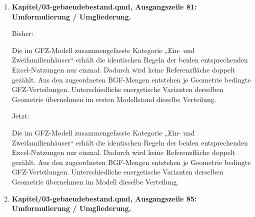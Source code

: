 \documentclass[
  ngerman,
  a4paper,
  DIV=11]{scrreprt}
\newenvironment{Shaded}{\begin{snugshade}}{\end{snugshade}}
\newcommand{\NormalTok}[1]{\textcolor[rgb]{0.00,0.23,0.31}{#1}}
\begin{document}
\begin{enumerate}
\begin{Shaded}
\begin{Highlighting}[]
\NormalTok{Der PE{-}Saldo von **−409,36 PJ PE/a** ist ein Ergebnis des gelieferten Bewertungsstands. Die konkreten Konversionsfaktoren und ihr Bezugsjahr sind nicht bestätigt. Effektive Faktoren unterscheiden sich zwischen Typen und zwischen Import und Export; eine einfache Multiplikation sämtlicher Stromflüsse mit einem Jahresmittel würde die gelieferten PEI nicht reproduzieren. Die sektorale Aufgabe 2040 bleibt auf Endenergiebasis definiert. Eine Bewertung mit heutigen Faktoren stellt die Vergleichbarkeit mit heutigen Nachweisverfahren her und ist keine Prognose der PE{-}Intensitäten 2040 (@sec{-}gebaeude{-}pe).}
\end{Highlighting}
\end{Shaded}
\item
  \textbf{Kapitel/03-gebaeudebestand.qmd, Ausgangszeile 81:
  Umformulierung / Umgliederung.}

  Bisher:

\begin{Shaded}
\begin{Highlighting}[]
\NormalTok{Die im GFZ{-}Modell zusammengefasste Kategorie „Ein{-} und Zweifamilienhäuser“ erhält die identischen Regeln der beiden entsprechenden Excel{-}Nutzungen nur einmal. Dadurch wird keine Referenzfläche doppelt gezählt. Aus den zugeordneten BGF{-}Mengen entstehen je Geometrie bedingte GFZ{-}Verteilungen. Unterschiedliche energetische Varianten derselben Geometrie übernehmen im ersten Modellstand dieselbe Verteilung.}
\end{Highlighting}
\end{Shaded}

  Jetzt:

\begin{Shaded}
\begin{Highlighting}[]
\NormalTok{Die im GFZ{-}Modell zusammengefasste Kategorie „Ein{-} und Zweifamilienhäuser“ erhält die identischen Regeln der beiden entsprechenden Excel{-}Nutzungen nur einmal. Dadurch wird keine Referenzfläche doppelt gezählt. Aus den zugeordneten BGF{-}Mengen entstehen je Geometrie bedingte GFZ{-}Verteilungen. Unterschiedliche energetische Varianten derselben Geometrie übernehmen im Modell dieselbe Verteilung.}
\end{Highlighting}
\end{Shaded}
\item
  \textbf{Kapitel/03-gebaeudebestand.qmd, Ausgangszeile 85:
  Umformulierung / Umgliederung.}


\end{enumerate}
\end{document}
